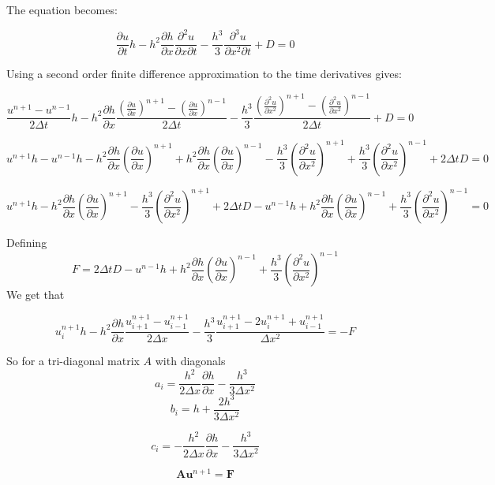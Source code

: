 \documentclass{article}
\begin{document}
The equation becomes:

\[\dfrac{\partial u}{\partial t}h - h^2\frac{\partial h}{\partial x}\dfrac{\partial^2 u}{\partial x \partial t}   - \dfrac{h^3}{3}\dfrac{\partial^3 u}{\partial x^2 \partial t} + D = 0\]

Using a second order finite difference approximation to the time derivatives gives:

\[\dfrac{u^{n+1} - u^{n-1}}{2\Delta t}h - h^2\frac{\partial h}{\partial x}\dfrac{\left(\frac{\partial u}{\partial x}\right)^{n+1} - \left(\frac{\partial u}{\partial x}\right)^{n-1}}{2\Delta t}   - \dfrac{h^3}{3}\dfrac{\left(\frac{\partial^2 u}{\partial x^2}\right)^{n+1} - \left(\frac{\partial^2 u}{\partial x^2}\right)^{n-1}}{2\Delta t} + D = 0\]

\[u^{n+1}h - u^{n-1}h - h^2\frac{\partial h}{\partial x}\left(\frac{\partial u}{\partial x}\right)^{n+1} +  h^2\frac{\partial h}{\partial x}\left(\frac{\partial u}{\partial x}\right)^{n-1} - \dfrac{h^3}{3}\left(\frac{\partial^2 u}{\partial x^2}\right)^{n+1} +\dfrac{h^3}{3}\left(\frac{\partial^2 u}{\partial x^2}\right)^{n-1} + 2\Delta tD = 0\]

\[u^{n+1}h - h^2\frac{\partial h}{\partial x}\left(\frac{\partial u}{\partial x}\right)^{n+1} - \dfrac{h^3}{3}\left(\frac{\partial^2 u}{\partial x^2}\right)^{n+1} + 2\Delta tD  - u^{n-1}h +  h^2\frac{\partial h}{\partial x}\left(\frac{\partial u}{\partial x}\right)^{n-1} +\dfrac{h^3}{3}\left(\frac{\partial^2 u}{\partial x^2}\right)^{n-1} = 0\]

Defining 
\[F = 2\Delta tD  - u^{n-1}h +  h^2\frac{\partial h}{\partial x}\left(\frac{\partial u}{\partial x}\right)^{n-1} +\dfrac{h^3}{3}\left(\frac{\partial^2 u}{\partial x^2}\right)^{n-1}\]
We get that

\[u^{n+1}_ih - h^2\frac{\partial h}{\partial x}\frac{u^{n+1}_{i+1} - u^{n+1}_{i-1}}{2\Delta x} - \dfrac{h^3}{3}\frac{u^{n+1}_{i+1} - 2u^{n+1}_{i} + u^{n+1}_{i-1}}{\Delta x^2} = -F\]

So for a tri-diagonal matrix $A$ with diagonals
\[a_i = \frac{h^2}{2\Delta x}\frac{\partial h}{\partial x} - \frac{h^3}{3\Delta x^2} \]
\[b_i = h + \frac{2h^3}{3 \Delta x^2} \]

\[c_i = -\frac{h^2}{2\Delta x}\frac{\partial h}{\partial x} - \frac{h^3}{3\Delta x^2} \]

\[\boldsymbol{A}\boldsymbol{u}^{n+1} =\boldsymbol{F}\]
\end{document}
